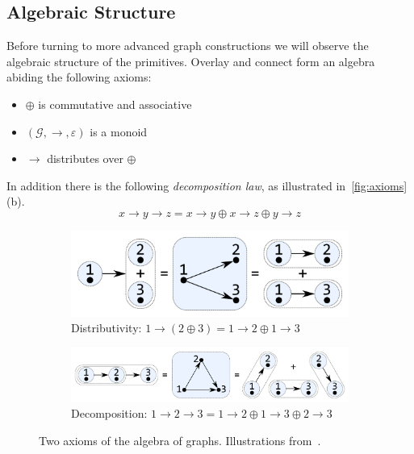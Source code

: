 \documentclass{article}
\renewcommand{\epsilon}{\varepsilon}
\newcommand{\eps}{\epsilon}
\newcommand{\overlay}{\oplus}
\newcommand{\connect}{\rightarrow}
\begin{document}
\subsection{Algebraic Structure}\label{sec:algebra}
Before turning to more advanced graph constructions we will observe the
algebraic structure of the primitives. Overlay and connect form an algebra
abiding the following axioms:
\begin{itemize}
\item $\oplus$ is commutative and associative
\item $(\mathcal{G}, \connect, \eps)$ is a monoid
\item $\connect$ distributes over $\overlay$
\end{itemize}
In addition there is the following
\textit{decomposition law}, as illustrated in~\autoref{fig:axioms}(b).
\[
  x \connect y \connect z = x \connect y \overlay x \connect z \overlay y \connect z
\]
\begin{figure}
  \begin{subfigure}[b]{0.4\linewidth}
    \centerline{\includegraphics[scale=0.24]{fig/ax-distributivity.pdf}}
    \caption{Distributivity: $1 \connect (2 \overlay 3) = 1 \connect 2 \overlay
      1 \connect 3$ }
  \end{subfigure}
  \hspace{12mm}
  \begin{subfigure}[b]{0.5\linewidth}
    \centerline{\includegraphics[scale=0.24]{fig/ax-decomposition.pdf}}
    \caption{Decomposition: $1 \connect 2 \connect 3 = 1 \connect 2 \overlay
      {1 \connect 3} \overlay {2 \connect 3}$}
  \end{subfigure}
  \vspace{-1mm}
  \caption{Two axioms of the algebra of graphs. Illustrations from~\cite{mokhov2017algebraic}.\label{fig:axioms}}
\end{figure}
\end{document}
